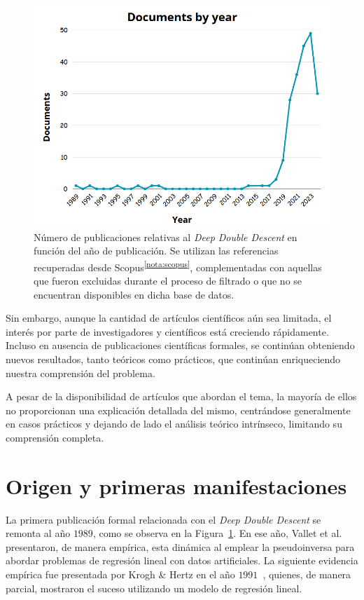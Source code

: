 \begin{figure}[h]
    \centering
    \includegraphics[width=0.7\linewidth]{img/scopus_histogram.png}
    \caption[Número de publicaciones relativas al \textit{Deep Double Descent} en función del año de publicación.] {Número de publicaciones relativas al \textit{Deep Double Descent} en función del año de publicación. Se utilizan las referencias recuperadas desde Scopus\textsuperscript{\ref{nota:scopus}}, complementadas con aquellas que fueron excluidas durante el proceso de filtrado o que no se encuentran disponibles en dicha base de datos.}\label{fig:histogram}
\end{figure}

Sin embargo, aunque la cantidad de artículos científicos aún sea limitada, el interés por parte de investigadores y científicos está creciendo rápidamente. Incluso en ausencia de publicaciones científicas formales, se continúan obteniendo nuevos resultados, tanto teóricos como prácticos, que continúan enriqueciendo nuestra comprensión del problema.

A pesar de la disponibilidad de artículos que abordan el tema, la mayoría de ellos no proporcionan una explicación detallada del mismo, centrándose generalmente en casos prácticos y dejando de lado el análisis teórico intrínseco, limitando su comprensión completa.

\section{Origen y primeras manifestaciones}\label{}

La primera publicación formal relacionada con el \textit{Deep Double Descent} se remonta al año $1989$, como se observa en la Figura~\ref{fig:histogram}. En ese año, Vallet et al.~\cite{Vallet1989} presentaron, de manera empírica, esta dinámica al emplear la pseudoinversa para abordar problemas de regresión lineal con datos artificiales. La siguiente evidencia empírica fue presentada por Krogh \& Hertz en el año $1991$~\cite{Krogh1991}, quienes, de manera parcial, mostraron el suceso utilizando un modelo de regresión lineal.

